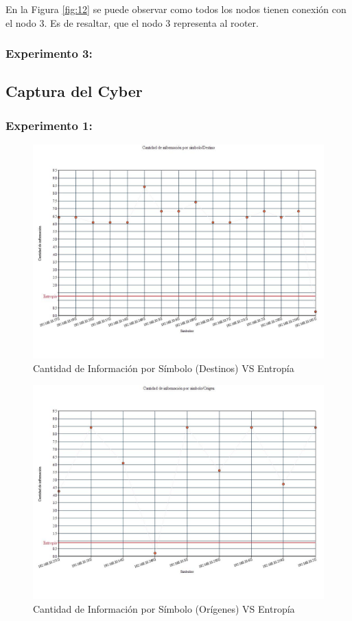 En la Figura \ref{fig:12} se puede observar como todos los nodos tienen conexión con el nodo 3. Es de resaltar, que el nodo 3 representa al rooter.

\subsubsection{Experimento 3:}

\subsection{Captura del Cyber}

\subsubsection{Experimento 1:}

\begin{figure}[H]
  \centering
    \includegraphics[scale=0.45]{imagenes/graficos/entropiaCantInf/06destino.jpg}
  \caption{Cantidad de Información por Símbolo (Destinos) VS Entropía}
  \label{fig:13}
\end{figure}

\begin{figure}[H]
  \centering
    \includegraphics[scale=0.45]{imagenes/graficos/entropiaCantInf/06Origen.jpg}
  \caption{Cantidad de Información por Símbolo (Orígenes) VS Entropía}
  \label{fig:14}
\end{figure}
